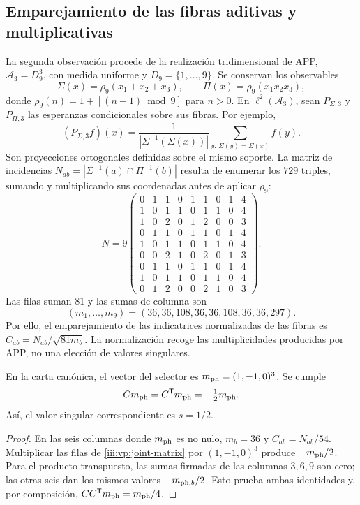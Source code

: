 \subsection{Emparejamiento de las fibras aditivas y multiplicativas}

La segunda observación procede de la realización tridimensional de APP,
$\mathcal A_3=D_9^3$, con medida uniforme y
$D_9=\{1,\ldots,9\}$. Se conservan los observables
\[
 \Sigma(x)=\rho_9(x_1+x_2+x_3),\qquad
 \Pi(x)=\rho_9(x_1x_2x_3),
\]
donde $\rho_9(n)=1+[(n-1)\bmod9]$ para $n>0$. En
$\ell^2(\mathcal A_3)$, sean $P_{\Sigma,3}$ y $P_{\Pi,3}$ las
esperanzas condicionales sobre sus fibras. Por ejemplo,
\[
 (P_{\Sigma,3}f)(x)=
 \frac1{|\Sigma^{-1}(\Sigma(x))|}
 \sum_{y:\,\Sigma(y)=\Sigma(x)}f(y).
\]
Son proyecciones ortogonales definidas sobre el mismo soporte. La matriz
de incidencias $N_{ab}=|\Sigma^{-1}(a)\cap\Pi^{-1}(b)|$ resulta de
enumerar los $729$ triples, sumando y multiplicando sus coordenadas antes
de aplicar $\rho_9$:
\begin{equation}
 N=9\begin{pmatrix}
 0&1&1&0&1&1&0&1&4\\
 1&0&1&1&0&1&1&0&4\\
 1&0&2&0&1&2&0&0&3\\
 0&1&1&0&1&1&0&1&4\\
 1&0&1&1&0&1&1&0&4\\
 0&0&2&1&0&2&0&1&3\\
 0&1&1&0&1&1&0&1&4\\
 1&0&1&1&0&1&1&0&4\\
 0&1&2&0&0&2&1&0&3
 \end{pmatrix}.
 \label{iii:vp:joint-matrix}
\end{equation}
Las filas suman $81$ y las sumas de columna son
\[
 (m_1,\ldots,m_9)=(36,36,108,36,36,108,36,36,297).
\]
Por ello, el emparejamiento de las indicatrices normalizadas de las fibras
es $C_{ab}=N_{ab}/\sqrt{81m_b}$. La normalización recoge las
multiplicidades producidas por APP, no una elección de valores singulares.

\begin{proposition}
En la carta canónica, el vector del selector es
$m_{\rm ph}=(1,-1,0)^3$. Se cumple
\begin{equation}
 Cm_{\rm ph}=C^{\mathsf T}m_{\rm ph}=-\tfrac12m_{\rm ph}.
 \label{iii:vp:trit-mode}
\end{equation}
Así, el valor singular correspondiente es $s=1/2$.
\end{proposition}
\begin{proof}
En las seis columnas donde $m_{\rm ph}$ es no nulo, $m_b=36$ y
$C_{ab}=N_{ab}/54$. Multiplicar las filas de
\eqref{iii:vp:joint-matrix} por $(1,-1,0)^3$ produce
$-m_{\rm ph}/2$. Para el producto transpuesto, las sumas firmadas
de las columnas $3,6,9$ son cero; las otras seis dan los mismos
valores $-m_{{\rm ph},b}/2$. Esto prueba ambas identidades y, por
composición, $CC^{\mathsf T}m_{\rm ph}=m_{\rm ph}/4$.
\end{proof}

